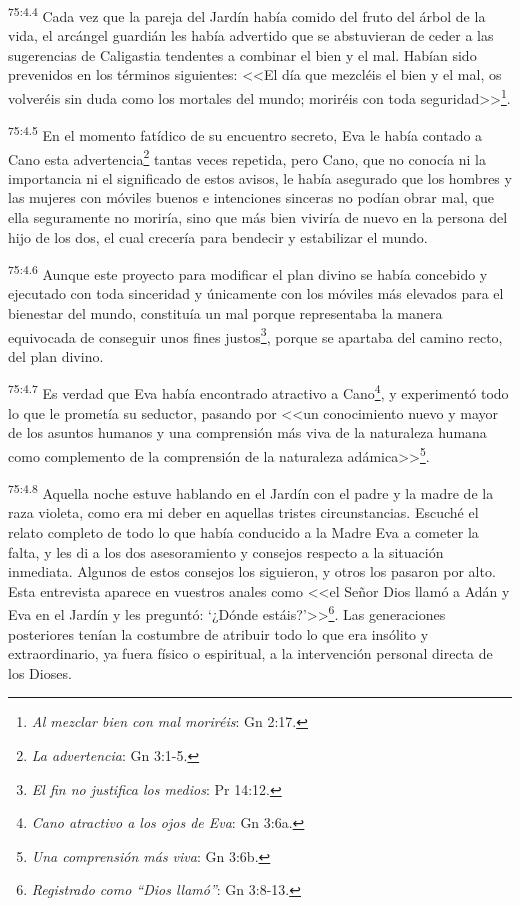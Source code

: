 \par
\textsuperscript{75:4.4} Cada vez que la pareja del Jardín había comido del fruto del árbol de la vida, el arcángel guardián les había advertido que se abstuvieran de ceder a las sugerencias de Caligastia tendentes a combinar el bien y el mal. Habían sido prevenidos en los términos siguientes: <<El día que mezcléis el bien y el mal, os volveréis sin duda como los mortales del mundo; moriréis con toda seguridad>>\footnote{\textit{Al mezclar bien con mal moriréis}: Gn 2:17.}.

\par
\textsuperscript{75:4.5} En el momento fatídico de su encuentro secreto, Eva le había contado a Cano esta advertencia\footnote{\textit{La advertencia}: Gn 3:1-5.} tantas veces repetida, pero Cano, que no conocía ni la importancia ni el significado de estos avisos, le había asegurado que los hombres y las mujeres con móviles buenos e intenciones sinceras no podían obrar mal, que ella seguramente no moriría, sino que más bien viviría de nuevo en la persona del hijo de los dos, el cual crecería para bendecir y estabilizar el mundo.

\par
\textsuperscript{75:4.6} Aunque este proyecto para modificar el plan divino se había concebido y ejecutado con toda sinceridad y únicamente con los móviles más elevados para el bienestar del mundo, constituía un mal porque representaba la manera equivocada de conseguir unos fines justos\footnote{\textit{El fin no justifica los medios}: Pr 14:12.}, porque se apartaba del camino recto, del plan divino.

\par
\textsuperscript{75:4.7} Es verdad que Eva había encontrado atractivo a Cano\footnote{\textit{Cano atractivo a los ojos de Eva}: Gn 3:6a.}, y experimentó todo lo que le prometía su seductor, pasando por <<un conocimiento nuevo y mayor de los asuntos humanos y una comprensión más viva de la naturaleza humana como complemento de la comprensión de la naturaleza adámica>>\footnote{\textit{Una comprensión más viva}: Gn 3:6b.}.

\par
\textsuperscript{75:4.8} Aquella noche estuve hablando en el Jardín con el padre y la madre de la raza violeta, como era mi deber en aquellas tristes circunstancias. Escuché el relato completo de todo lo que había conducido a la Madre Eva a cometer la falta, y les di a los dos asesoramiento y consejos respecto a la situación inmediata. Algunos de estos consejos los siguieron, y otros los pasaron por alto. Esta entrevista aparece en vuestros anales como <<el Señor Dios llamó a Adán y Eva en el Jardín y les preguntó:
`¿Dónde estáis?'>>\footnote{\textit{Registrado como ``Dios llamó''}: Gn 3:8-13.}. Las generaciones posteriores tenían la costumbre de atribuir todo lo que era insólito y extraordinario, ya fuera físico o espiritual, a la intervención personal directa de los Dioses.

